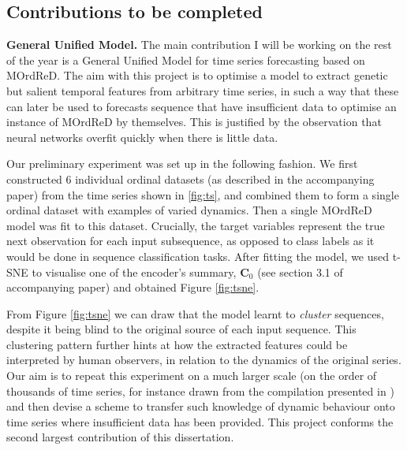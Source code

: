 \documentclass[pdftex,12pt,a4paper]{article}
\theoremstyle{definition}
\theoremstyle{remark}
\begin{document}
\subsection{Contributions to be completed}

\textbf{General Unified Model.} The main contribution I will be working on the rest of the year is a General Unified Model for time series forecasting based on MOrdReD. The aim with this project is to optimise a model to extract genetic but salient temporal features from arbitrary time series, in such a way that these can later be used to forecasts sequence that have insufficient data to optimise an instance of MOrdReD by themselves. This is justified by the observation that neural networks overfit quickly when there is little data.

Our preliminary experiment was set up in the following fashion. We first constructed 6 individual ordinal datasets (as described in the accompanying paper) from the time series shown in \ref{fig:ts}, and combined them to form a single ordinal dataset with examples of varied dynamics. Then a single MOrdReD model was fit to this dataset. Crucially, the target variables represent the true next observation for each input subsequence, as opposed to class labels as it would be done in sequence classification tasks. After fitting the model, we used t-SNE \citep{vanDerMaaten2008} to visualise one of the encoder's summary, $\mathbf{C}_0$ (see section 3.1 of accompanying paper) and obtained Figure \ref{fig:tsne}.

From Figure \ref{fig:tsne} we can draw that the model learnt to \textit{cluster} sequences, despite it being blind to the original source of each input sequence. This clustering pattern further hints at how the extracted features could be interpreted by human observers, in relation to the dynamics of the original series. Our aim is to repeat this experiment on a much larger scale (on the order of thousands of time series, for instance drawn from the compilation presented in \citep{Fulcher20130048}) and then devise a scheme to transfer such knowledge of dynamic behaviour onto time series where insufficient data has been provided. This project conforms the second largest contribution of this dissertation.
\end{document}
